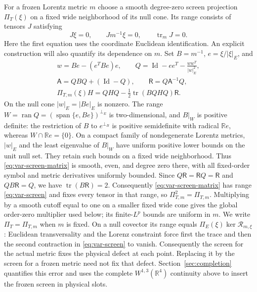 \documentclass[11pt,a4paper]{article}
\numberwithin{equation}{section}
\newcommand{\tr}{\operatorname{tr}}
\newcommand{\Id}{\operatorname{Id}}
\newcommand{\R}{\mathbb R}
\newcommand{\f}[2]{\frac{#1}{#2}}
\theoremstyle{definition}
\begin{document}
For a frozen Lorentz metric $m$ choose a smooth degree-zero screen
projection $\Pi_T(\xi)$ on a fixed wide neighborhood of its null cone.
Its range consists of tensors $J$ satisfying
\begin{equation}\label{eq:var-screen}
J\xi=0,\qquad Jm^{-1}\xi=0,\qquad\tr_mJ=0.
\end{equation}
Here the first equation uses the coordinate Euclidean identification.
An explicit construction will also quantify its dependence on $m$.
Set $B=m^{-1}$, $e=\xi/|\xi|_E$, and
\begin{equation}\label{eq:var-screen-matrix}
\begin{gathered}
w=Be-(e^TBe)e,\qquad
Q=\Id-ee^T-\f{ww^T}{|w|_E^2},\\
\mathsf A=QBQ+(\Id-Q),\qquad
\mathsf R=Q\mathsf A^{-1}Q,\\
\Pi_{T,m}(\xi)H=QHQ-\f12\operatorname{tr}(BQHQ)\mathsf R.
\end{gathered}
\end{equation}
On the null cone $|w|_E=|Be|_E$ is nonzero. The range
$W=\operatorname{ran}Q=(\operatorname{span}\{e,Be\})^{\perp_E}$
is two-dimensional, and $B|_W$ is positive definite: the restriction of
$B$ to $e^{\perp_B}$ is positive semidefinite with radical $\R e$,
whereas $W\cap\R e=\{0\}$. On a compact family of nondegenerate
Lorentz metrics, $|w|_E$ and the least eigenvalue of $B|_W$ have
uniform positive lower bounds on the unit null set. They retain such
bounds on a fixed wide neighborhood. Thus \eqref{eq:var-screen-matrix}
is smooth, even, and degree zero there, with all fixed-order symbol and
metric derivatives uniformly bounded.
Since $Q\mathsf R=\mathsf RQ=\mathsf R$ and
$QB\mathsf R=Q$, we have $\operatorname{tr}(B\mathsf R)=2$.
Consequently \eqref{eq:var-screen-matrix} has range
\eqref{eq:var-screen} and fixes every tensor in that range, so
$\Pi_{T,m}^2=\Pi_{T,m}$. Multiplying by a smooth cutoff equal to one
on a smaller fixed wide cone gives the global order-zero multiplier
used below; its finite-$L^p$ bounds are uniform in $m$.
We write $\Pi_T=\Pi_{T,m}$ when $m$ is fixed. On a null covector its range equals
$\Pi_E(\xi)\ker\mathcal R_{m,\xi}$: Euclidean transversality and the
Lorenz constraint force first the trace and then the second contraction
in \eqref{eq:var-screen} to vanish. Consequently the screen for the
actual metric fixes the physical defect at each point. Replacing it
by the screen for a frozen metric need not fix that defect.
Section~\ref{sec:completion} quantifies this error and uses the complete
$W^{1,3}(\R^4)$ continuity above to insert the frozen screen in physical slots.
\end{document}
